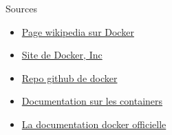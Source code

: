  \begin{frame}{Sources}
 \begin{itemize}
     \item \href{https://en.wikipedia.org/wiki/Docker_(software)}{Page wikipedia sur Docker}
     \item \href{https://www.docker.com/}{Site de Docker, Inc}
     \item \href{https://github.com/docker/docker-ce}{Repo github de docker}
     \item \href{https://www.aquasec.com/wiki/display/containers/}{Documentation sur les containers}
     \item \href{https://docs.docker.com/develop}{La documentation docker officielle}
 \end{itemize}
 \end{frame}
